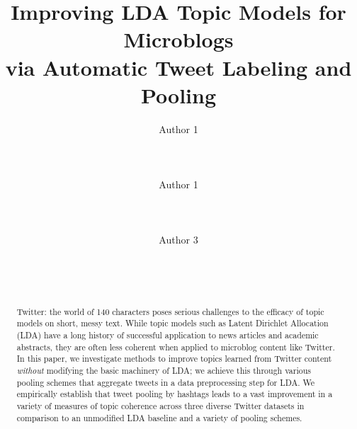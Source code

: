 \documentclass{sig-alternate}
\begin{document}
\title{Improving LDA Topic Models for Microblogs\\ via Automatic Tweet Labeling and Pooling}

\author{
\alignauthor
Author 1\\
       \\
       \\
       \\
\alignauthor
Author 1\\
       \\
       \\
       \\
\alignauthor
Author 3\\
       \\
       \\
       \\
}


\maketitle
\begin{abstract}
Twitter: the world of 140 characters poses serious challenges to the
efficacy of topic models on short, messy text. While topic models such
as Latent Dirichlet Allocation (LDA) have a long history of successful
application to news articles and academic abstracts, they are often
less coherent when applied to microblog content like Twitter.  In this
paper, we investigate methods to improve topics learned from Twitter
content \emph{without} modifying the basic machinery of LDA; we
achieve this through various pooling schemes that aggregate tweets in
a data preprocessing step for LDA.  We empirically establish that
tweet pooling by hashtags leads to a vast improvement in a variety of
measures of topic coherence across three diverse Twitter datasets in
comparison to an unmodified LDA baseline and a variety of pooling
schemes.
\begin{comment}a novel method of combining
  automatic hashtag labeling techniques with 
\end{comment}
\end{abstract}
\end{document}
